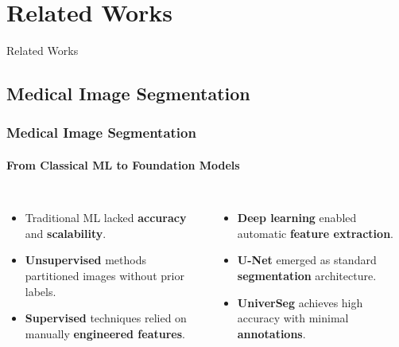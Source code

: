 \documentclass[nometaot,lecture,amberg,toc=twocolumn,indicatelastpageofframe,footlinebox]{OTHAWbeamer}
\begin{document}
\section{Related Works}
\begin{breakframe}
    Related Works
\end{breakframe}

\subsection{Medical Image Segmentation}
\begin{frame}[label=relworks1]
    \frametitle{Medical Image Segmentation}
    \framesubtitle{From Classical ML to Foundation Models}

    \begin{columns}[T]
            \vspace{0.3cm}
            \begin{itemize}\small
                \item Traditional ML lacked \textbf{\textcolor{orange1}{accuracy}} and \textbf{\textcolor{orange1}{scalability}}.

                \vspace{0.4em}
                \item \textbf{\textcolor{orange1}{Unsupervised}} methods partitioned images without prior labels.

                \vspace{0.4em}
                \item \textbf{\textcolor{orange1}{Supervised}} techniques relied on manually \textbf{\textcolor{orange1}{engineered features}}.
            \end{itemize}

            \vspace{0.3cm}
            \begin{itemize}\small
                \item \textbf{\textcolor{orange1}{Deep learning}} enabled automatic \textbf{\textcolor{orange1}{feature extraction}}.

                \vspace{0.4em}
                \item \textbf{\textcolor{orange1}{U-Net}} emerged as standard \textbf{\textcolor{orange1}{segmentation}} architecture.

                \vspace{0.4em}
                \item \textbf{\textcolor{orange1}{UniverSeg}} achieves high accuracy with minimal \textbf{\textcolor{orange1}{annotations}}.
            \end{itemize}

    \end{columns}

\end{frame}
\end{document}
